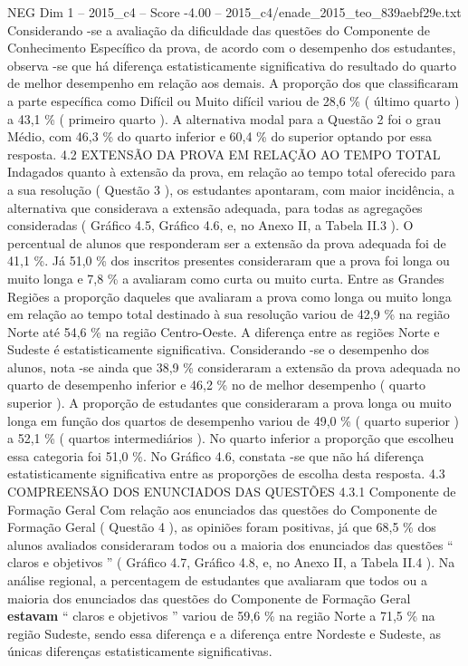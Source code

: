 \begin{textsample}{NEG Dim 1 – 2015\_c4 – Score -4.00 – 2015\_c4/enade\_2015\_teo\_839aebf29e.txt}
Considerando -se a avaliação da dificuldade das questões do Componente de Conhecimento Específico da prova, de acordo com o desempenho dos estudantes, observa -se que há diferença estatisticamente significativa do resultado do quarto de melhor desempenho em relação aos demais.
A proporção dos que classificaram a parte específica como Difícil ou Muito difícil variou de 28,6 \% ( último quarto ) a 43,1 \% ( primeiro quarto ).
A alternativa modal para a Questão 2 foi o grau Médio, com 46,3 \% do quarto inferior e 60,4 \% do superior optando por essa resposta. 4.2 EXTENSÃO DA PROVA EM RELAÇÃO AO TEMPO TOTAL Indagados quanto à extensão da prova, em relação ao tempo total oferecido para a sua resolução ( Questão 3 ), os estudantes apontaram, com maior incidência, a alternativa que considerava a extensão adequada, para todas as agregações consideradas ( Gráfico 4.5, Gráfico 4.6, e, no Anexo II, a Tabela II.3 ).
O percentual de alunos que responderam ser a extensão da prova adequada foi de 41,1 \%.
Já 51,0 \% dos inscritos presentes consideraram que a prova foi longa ou muito longa e 7,8 \% a avaliaram como curta ou muito curta.
Entre as Grandes Regiões a proporção daqueles que avaliaram a prova como longa ou muito longa em relação ao tempo total destinado à sua resolução variou de 42,9 \% na região Norte até 54,6 \% na região Centro-Oeste.
A diferença entre as regiões Norte e Sudeste é estatisticamente significativa.
Considerando -se o desempenho dos alunos, nota -se ainda que 38,9 \% consideraram a extensão da prova adequada no quarto de desempenho inferior e 46,2 \% no de melhor desempenho ( quarto superior ).
A proporção de estudantes que consideraram a prova longa ou muito longa em função dos quartos de desempenho variou de 49,0 \% ( quarto superior ) a 52,1 \% ( quartos intermediários ).
No quarto inferior a proporção que escolheu essa categoria foi 51,0 \%.
No Gráfico 4.6, constata -se que não há diferença estatisticamente significativa entre as proporções de escolha desta resposta. 4.3 COMPREENSÃO DOS ENUNCIADOS DAS QUESTÕES 4.3.1 Componente de Formação Geral Com relação aos enunciados das questões do Componente de Formação Geral ( Questão 4 ), as opiniões foram positivas, já que 68,5 \% dos alunos avaliados consideraram todos ou a maioria dos enunciados das questões “ claros e objetivos ” ( Gráfico 4.7, Gráfico 4.8, e, no Anexo II, a Tabela II.4 ).
Na análise regional, a percentagem de estudantes que avaliaram que todos ou a maioria dos enunciados das questões do Componente de Formação Geral \textbf{estavam} “ claros e objetivos ” variou de 59,6 \% na região Norte a 71,5 \% na região Sudeste, sendo essa diferença e a diferença entre Nordeste e Sudeste, as únicas diferenças estatisticamente significativas.

\end{textsample}
